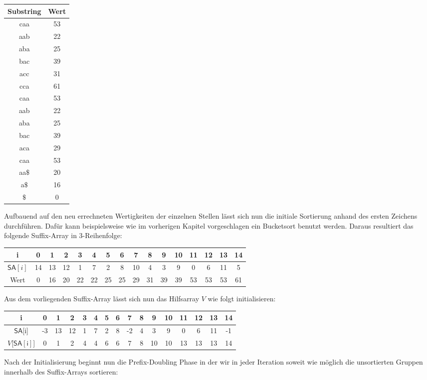 \begin{center}
\begin{tabular}{c | c}
Substring & Wert \\
\hline
caa & 53 \\
aab & 22 \\
aba & 25 \\
bac & 39 \\
acc & 31 \\
cca & 61 \\
caa & 53 \\
aab & 22 \\
aba & 25 \\
bac & 39 \\
aca & 29 \\
caa & 53 \\
aa$\$$ & 20 \\
a$\$$ & 16 \\
$\$$ & 0 
\end{tabular}
\end{center}

Aufbauend auf den neu errechneten Wertigkeiten der einzelnen Stellen lässt sich nun die initiale Sortierung anhand des ersten Zeichens durchführen. Dafür kann beispielsweise wie im vorherigen Kapitel vorgeschlagen ein Bucketsort benutzt werden. Daraus resultiert das folgende Suffix-Array in 3-Reihenfolge:\\
\begin{center}
\begin{tabular}{| c | c | c | c | c | c | c | c | c | c | c | c | c | c | c | c |}
\hline
i & 0 & 1 &2 &3 &4 &5 &6 &7 &8 &9 &10 &11 &12 &13 &14 \\
\hline
$\mathsf{SA}[i]$ & 14 & 13 &12 &1 &7 & 2 &8 &10 &4 &3 &9 &0 &6 &11 &5 \\
\hline
Wert & 0 & 16 &20 &22 &22 &25 &25 &29 &31 &39 &39 &53 &53 &53 &61 \\
\hline
\end{tabular}
\end{center}
Aus dem vorliegenden Suffix-Array lässt sich nun das Hilfsarray $V$ wie folgt initialisieren:\\
\begin{center}
\begin{tabular}{| c | c | c | c | c | c | c | c | c | c | c | c | c | c | c | c |}
\hline
i & 0 & 1 &2 &3 &4 &5 &6 &7 &8 &9 &10 &11 &12 &13 &14 \\
\hline
$\mathsf{SA}$[i] & -3 & 13 &12 &1 &7 & 2 &8 &-2 &4 &3 &9 &0 &6 &11 &-1 \\

$V$[$\mathsf{SA[i]}$] & 0 & 1 & 2 & 4 & 4 & 6 & 6 & 7 & 8 & 10 & 10 & 13 & 13 & 13 & 14 \\
\hline
\end{tabular}
\end{center}
Nach der Initialisierung beginnt nun die Prefix-Doubling Phase in der wir in jeder Iteration soweit wie möglich die unsortierten Gruppen innerhalb des Suffix-Arrays sortieren:


